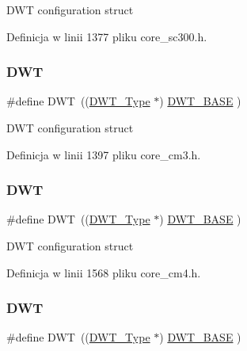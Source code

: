 D\+WT configuration struct 

Definicja w linii 1377 pliku core\+\_\+sc300.\+h.

\mbox{\label{group___c_m_s_i_s__core__base_gabbe5a060185e1d5afa3f85b14e10a6ce}} 
\subsubsection{\texorpdfstring{D\+WT}{DWT}\hspace{0.1cm}{\footnotesize\ttfamily [4/8]}}
{\footnotesize\ttfamily \#define D\+WT~((\hyperlink{struct_d_w_t___type}{D\+W\+T\+\_\+\+Type}       $\ast$)     \hyperlink{group___c_m_s_i_s__core__base_gafdab534f961bf8935eb456cb7700dcd2}{D\+W\+T\+\_\+\+B\+A\+SE}      )}

D\+WT configuration struct 

Definicja w linii 1397 pliku core\+\_\+cm3.\+h.

\mbox{\label{group___c_m_s_i_s__core__base_gabbe5a060185e1d5afa3f85b14e10a6ce}} 
\subsubsection{\texorpdfstring{D\+WT}{DWT}\hspace{0.1cm}{\footnotesize\ttfamily [5/8]}}
{\footnotesize\ttfamily \#define D\+WT~((\hyperlink{struct_d_w_t___type}{D\+W\+T\+\_\+\+Type}       $\ast$)     \hyperlink{group___c_m_s_i_s__core__base_gafdab534f961bf8935eb456cb7700dcd2}{D\+W\+T\+\_\+\+B\+A\+SE}      )}

D\+WT configuration struct 

Definicja w linii 1568 pliku core\+\_\+cm4.\+h.

\mbox{\label{group___c_m_s_i_s__core__base_gabbe5a060185e1d5afa3f85b14e10a6ce}} 
\subsubsection{\texorpdfstring{D\+WT}{DWT}\hspace{0.1cm}{\footnotesize\ttfamily [6/8]}}
{\footnotesize\ttfamily \#define D\+WT~((\hyperlink{struct_d_w_t___type}{D\+W\+T\+\_\+\+Type}       $\ast$)     \hyperlink{group___c_m_s_i_s__core__base_gafdab534f961bf8935eb456cb7700dcd2}{D\+W\+T\+\_\+\+B\+A\+SE}      )}

